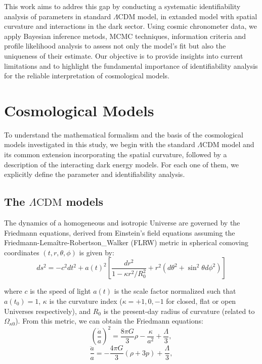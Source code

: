 \documentclass[final,3p,times]{elsarticle}
\begin{document}
This work aims to addres this gap by conducting a systematic identifiability analysis of parameters in standard $\Lambda\text{CDM}$ model, in extanded model with spatial curvature and interactions in the dark sector. Using cosmic chronometer data, we apply Bayesian inference metods, MCMC techniques, information criteria and profile likelihood analysis to assess not only the model's fit but also the uniqueness of their estimate. Our objective is to provide insights into current limitations and to highlight the fundamental importance of identifiability analysis for the reliable interpretation of cosmological models.

\section{Cosmological Models}
\label{sec:models}

To understand the mathematical formalism and the basis of the cosmological models investigated in this study, we begin with the standard $\Lambda\text{CDM}$ model and its common extension incorporating the spatial curvature, followed by a description of the interacting dark energy models. For each one of them, we explicitly define the parameter and identifiability analysis.

\subsection{The $\Lambda\text{CDM}$ models}
\label{subsec:lcdm}

The dynamics of a homogeneous and isotropic Universe are governed by the Friedmann equations, derived from Einstein's field equations assuming the Friedmann-Lemaître-Robertson_Walker (FLRW) metric in spherical comoving coordinates $(t, r, \theta, \phi)$ is given by:
\begin{equation}
    ds^2 = -c^2 dt^2 + a(t)^2 \left[ \frac{dr^2}{1-\kappa r^2/R_0^2} + r^2(d\theta^2 + \sin^2\theta d\phi^2) \right]
    \label{eq:flrw_metric}
\end{equation}

where $c$ is the speed of light $a(t)$ is the scale factor normalized such that $a(t_0)=1$, $\kappa$ is the curvature index ($\kappa = +1, 0, -1$ for closed, flat or  open Universes respectively), and $R_0$ is the present-day radius of curvature (related to $\Omega_{\kappa0}$).
From this metric, we can obtain the Friedmann equations:
\begin{equation}
    \left(\frac{\dot{a}}{a}\right)^2 = \frac{8 \pi G}{3}\rho - \frac{\kappa}{a^2} + \frac{\Lambda}{3},
    \label{eq:friedmann-1}
\end{equation}
\begin{equation}
    \frac{\ddot{a}}{a} = -\frac{4 \pi G}{3} (\rho + 3p) + \frac{\Lambda}{3},
    \label{eq:friedmann-2}
\end{equation}
\end{document}
